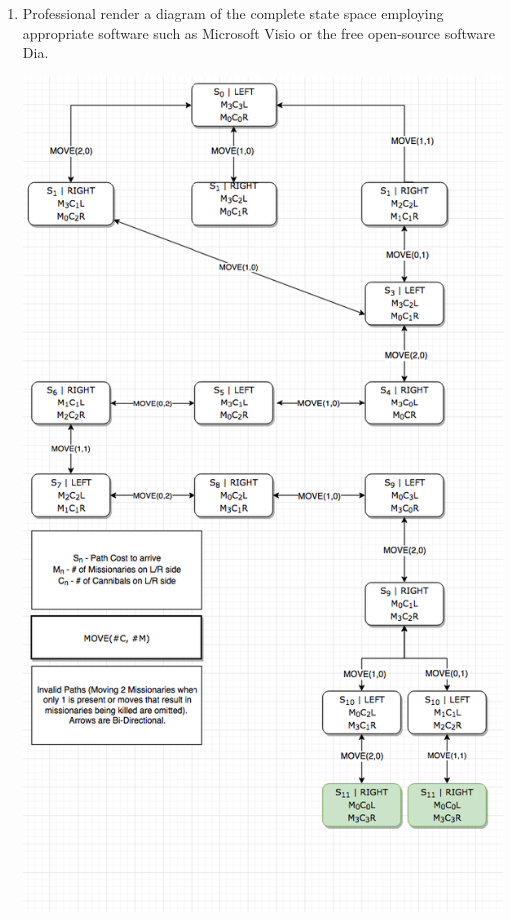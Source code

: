 \documentclass[12pt]{article}
\begin{document}
\begin{enumerate}
  \item Professional render a diagram of the complete state space employing appropriate software such as Microsoft Visio or the free open-source software Dia.\par
  \includegraphics[width=\textwidth]{StateGraph.png}


\end{enumerate}
\end{document}

